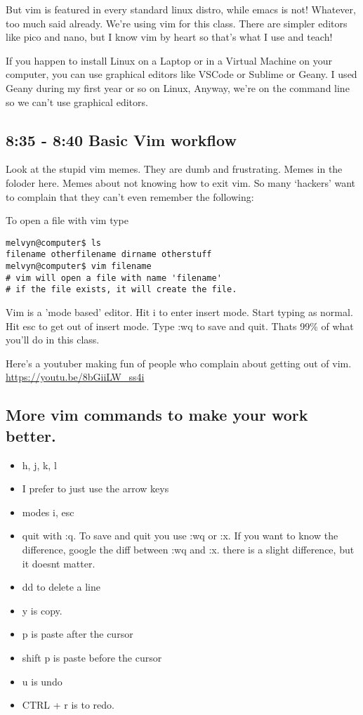 \documentclass[10pt]{article}
\begin{document}
But vim is featured in every standard linux distro, while emacs is not! 
Whatever, too much said already. We're using vim for this class.
There are simpler editors like pico and nano, but I know vim by heart so that's what I use and teach!

If you happen to install Linux on a Laptop or in a Virtual Machine on your
computer, you can use graphical editors like VSCode or Sublime or Geany. I
used Geany during my first year or so on Linux, Anyway, we're on the command
line so we can't use graphical editors.

\subsection*{8:35 - 8:40 Basic Vim workflow}
Look at the stupid vim memes. They are dumb and frustrating. Memes in the
foloder here. Memes about not knowing how to exit vim. So many `hackers'
want to complain that they can't even remember the following:

To open a file with vim type

\begin{lstlisting}[style=term]
melvyn@computer$ ls
filename otherfilename dirname otherstuff
melvyn@computer$ vim filename
# vim will open a file with name 'filename'
# if the file exists, it will create the file.
\end{lstlisting}

Vim is a 'mode based' editor. 
Hit i to enter insert mode. Start typing as normal.
Hit esc to get out of insert mode.
Type :wq to save and quit. 
Thats 99\% of what you'll do in this class.

Here's a youtuber making fun of people who complain about getting out of vim. \url{https://youtu.be/8bGiiLW_ss4i}

\subsection*{ More vim commands to make your work better.}
\begin{itemize}
\item h, j, k, l
\item I prefer to just use the arrow keys
\item modes i, esc
\item quit with :q. To save and quit you use :wq or :x. If you want to know the difference, google the diff between :wq and :x. there is a slight difference, but it doesnt matter.
\item dd to delete a line
\item y is copy.
\item p is paste after the cursor
\item shift p is paste before the cursor
\item u is undo
\item CTRL + r is to redo.
\end{itemize}
\end{document}
